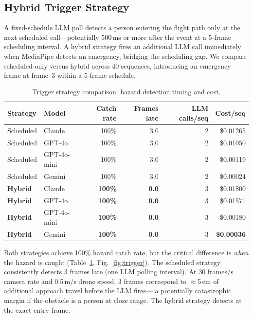 \documentclass[journal]{IEEEtran}
\begin{document}
\subsection{Hybrid Trigger Strategy}
\label{sec:g2}

A fixed-schedule LLM poll detects a person entering the flight path only
at the next scheduled call---potentially 500\,ms or more after the event
at a 5-frame scheduling interval.
A hybrid strategy fires an additional LLM call immediately when MediaPipe
detects an emergency, bridging the scheduling gap.
We compare scheduled-only versus hybrid across 40 sequences, introducing
an emergency frame at frame~3 within a 5-frame schedule.

\begin{table}[!t]
  \caption{Trigger strategy comparison: hazard detection timing and cost.}
  \label{tab:trigger}
  \centering
  \small
  \begin{tabular}{llrrrr}
    \toprule
    Strategy & Model & Catch rate & Frames late & LLM calls/seq & Cost/seq \\
    \midrule
    Scheduled     & Claude      & 100\% & 3.0 & 2 & \$0.01265 \\
    Scheduled     & GPT-4o      & 100\% & 3.0 & 2 & \$0.01050 \\
    Scheduled     & GPT-4o-mini & 100\% & 3.0 & 2 & \$0.00119 \\
    Scheduled     & Gemini      & 100\% & 3.0 & 2 & \$0.00024 \\
    \midrule
    \textbf{Hybrid} & Claude      & \textbf{100\%} & \textbf{0.0} & 3 & \$0.01800 \\
    \textbf{Hybrid} & GPT-4o      & \textbf{100\%} & \textbf{0.0} & 3 & \$0.01571 \\
    \textbf{Hybrid} & GPT-4o-mini & \textbf{100\%} & \textbf{0.0} & 3 & \$0.00180 \\
    \textbf{Hybrid} & Gemini      & \textbf{100\%} & \textbf{0.0} & 3 & \textbf{\$0.00036} \\
    \bottomrule
  \end{tabular}
\end{table}

Both strategies achieve 100\% hazard catch rate, but the critical
difference is \emph{when} the hazard is caught
(Table~\ref{tab:trigger}, Fig.~\ref{fig:trigger}).
The scheduled strategy consistently detects 3 frames late (one LLM
polling interval).
At 30 frames/s camera rate and 0.5\,m/s drone speed, 3 frames correspond
to $\approx$5\,cm of additional approach travel before the LLM fires---
a potentially catastrophic margin if the obstacle is a person at close
range.
The hybrid strategy detects at the exact entry frame.
\end{document}
